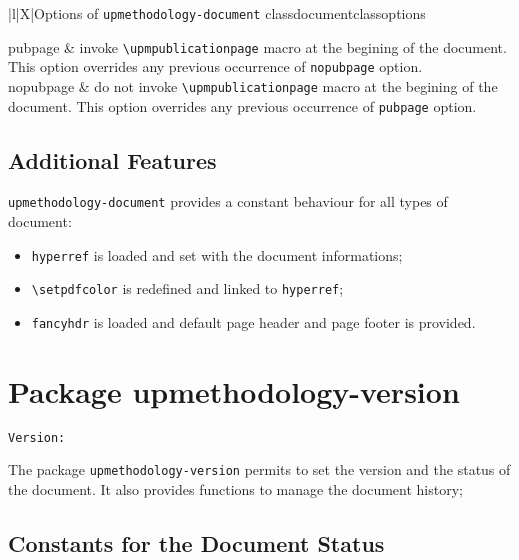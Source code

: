 \documentclass[book]{upmethodology-document}
\makeatletter
\let\VERversion\upm@package@version@ver
\makeatother
\begin{document}
\begin{mtable}{\linewidth}{2}{|l|X|}{Options of \texttt{upmethodology-document} class}{documentclassoptions}
\hline\hline

pubpage & invoke \texttt{{\textbackslash}upmpublicationpage} macro at the begining of the document. This option overrides any previous occurrence of \texttt{nopubpage} option. \\
\hline
nopubpage & do not invoke \texttt{{\textbackslash}upmpublicationpage} macro at the begining of the document. This option overrides any 
previous occurrence of \texttt{pubpage} option. \\

\hline
\end{mtable}

\section{Additional Features}

\texttt{upmethodology-document} provides a constant behaviour for all types of document:
\begin{itemize}
\item \texttt{hyperref} is loaded and set with the document informations;
\item \texttt{{\textbackslash}setpdfcolor} is redefined and linked to \texttt{hyperref};
\item \texttt{fancyhdr} is loaded and default page header and page footer is provided.
\end{itemize}


\chapter{Package upmethodology-version}

\begin{center}
	\texttt{Version: \VERversion}
\end{center}

The package \texttt{upmethodology-version} permits to set the version and the status of the document. It also provides functions to manage the document history;

\section{Constants for the Document Status}
\end{document}
